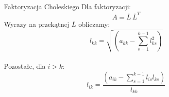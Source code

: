 \begin{frame}{Faktoryzacja Choleskiego}
Dla faktoryzacji:
$$A=\overline{L}\ \overline{L}^{T}$$
  Wyrazy na przekątnej $\overline{L}$ obliczamy:\\
  $$l_{kk}=\sqrt{(a_{kk}-\sum_{s=1}^{k-1}{l_{ks}^2})}$$ \\
  Pozostałe, dla $i>k$:
  $$l_{ik}=\frac{(a_{ik}-\sum_{s=1}^{k-1}{l_{is}l_{ks}})}{l_{kk}}$$ \\
\end{frame}

 












